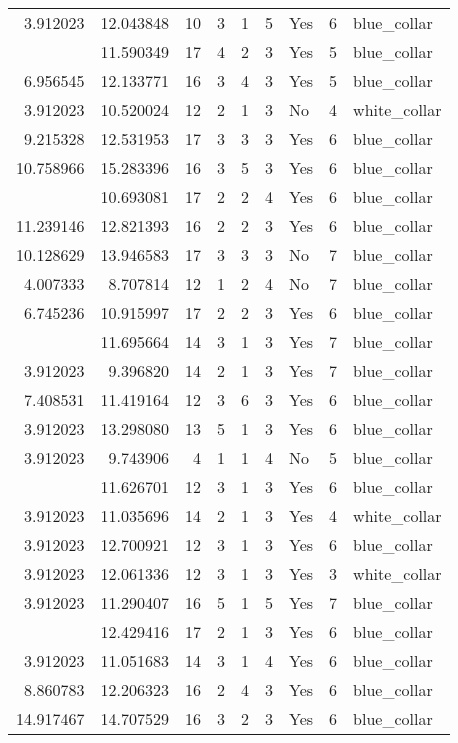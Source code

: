 \documentclass[
]{article}
\begin{document}
\begin{longtable}[t]{rrrrrllrl}
3.912023 & 12.043848 & 10 & 3 & 1 & 5 & Yes & 6 & blue\_collar\\
\addlinespace
8.022897 & 11.590349 & 17 & 4 & 2 & 3 & Yes & 5 & blue\_collar\\
6.956545 & 12.133771 & 16 & 3 & 4 & 3 & Yes & 5 & blue\_collar\\
3.912023 & 10.520024 & 12 & 2 & 1 & 3 & No & 4 & white\_collar\\
9.215328 & 12.531953 & 17 & 3 & 3 & 3 & Yes & 6 & blue\_collar\\
10.758966 & 15.283396 & 16 & 3 & 5 & 3 & Yes & 6 & blue\_collar\\
\addlinespace
8.915969 & 10.693081 & 17 & 2 & 2 & 4 & Yes & 6 & blue\_collar\\
11.239146 & 12.821393 & 16 & 2 & 2 & 3 & Yes & 6 & blue\_collar\\
10.128629 & 13.946583 & 17 & 3 & 3 & 3 & No & 7 & blue\_collar\\
4.007333 & 8.707814 & 12 & 1 & 2 & 4 & No & 7 & blue\_collar\\
6.745236 & 10.915997 & 17 & 2 & 2 & 3 & Yes & 6 & blue\_collar\\
\addlinespace
3.912023 & 11.695664 & 14 & 3 & 1 & 3 & Yes & 7 & blue\_collar\\
3.912023 & 9.396820 & 14 & 2 & 1 & 3 & Yes & 7 & blue\_collar\\
7.408531 & 11.419164 & 12 & 3 & 6 & 3 & Yes & 6 & blue\_collar\\
3.912023 & 13.298080 & 13 & 5 & 1 & 3 & Yes & 6 & blue\_collar\\
3.912023 & 9.743906 & 4 & 1 & 1 & 4 & No & 5 & blue\_collar\\
\addlinespace
3.912023 & 11.626701 & 12 & 3 & 1 & 3 & Yes & 6 & blue\_collar\\
3.912023 & 11.035696 & 14 & 2 & 1 & 3 & Yes & 4 & white\_collar\\
3.912023 & 12.700921 & 12 & 3 & 1 & 3 & Yes & 6 & blue\_collar\\
3.912023 & 12.061336 & 12 & 3 & 1 & 3 & Yes & 3 & white\_collar\\
3.912023 & 11.290407 & 16 & 5 & 1 & 5 & Yes & 7 & blue\_collar\\
\addlinespace
3.912023 & 12.429416 & 17 & 2 & 1 & 3 & Yes & 6 & blue\_collar\\
3.912023 & 11.051683 & 14 & 3 & 1 & 4 & Yes & 6 & blue\_collar\\
8.860783 & 12.206323 & 16 & 2 & 4 & 3 & Yes & 6 & blue\_collar\\
14.917467 & 14.707529 & 16 & 3 & 2 & 3 & Yes & 6 & blue\_collar\\

\end{longtable}
\end{document}
